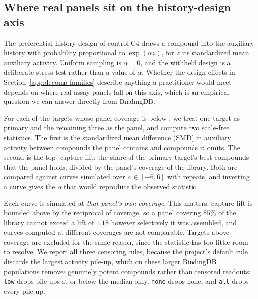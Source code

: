 \documentclass[10pt]{article}
\begin{document}
\subsection{Where real panels sit on the history-design axis}
\label{app:panel-alpha}

The preferential history design of control C4 draws a compound into the
auxiliary history with probability proportional to $\exp(\alpha z)$, for $z$
its standardized mean auxiliary activity. Uniform sampling is $\alpha=0$, and
the withheld design is a deliberate stress test rather than a value of
$\alpha$. Whether the design effects in Section~\ref{app:decomp-families}
describe anything a practitioner would meet depends on where real assay
panels fall on this axis, which is an empirical question we can answer
directly from BindingDB.

For each of the \panelReliableTargets{} targets whose panel coverage is below
\panelMaxCoverage{}, we treat one target as primary and the remaining three as
the panel, and compute two scale-free statistics. The first is the
standardized mean difference (SMD) in auxiliary activity between compounds the
panel contains and compounds it omits. The second is the top-\panelTopK{}
capture lift: the share of the primary target's \panelTopK{} best compounds
that the panel holds, divided by the panel's coverage of the library. Both are
compared against curves simulated over $\alpha\in[-6,6]$ with
\panelRepeats{} repeats, and inverting a curve gives the $\alpha$ that would
reproduce the observed statistic.

Each curve is simulated at \emph{that panel's own coverage}. This matters:
capture lift is bounded above by the reciprocal of coverage, so a panel
covering $85\%$ of the library cannot exceed a lift of $1.18$ however
selectively it was assembled, and curves computed at different coverages are
not comparable. Targets above \panelMaxCoverage{} coverage are excluded for
the same reason, since the statistic has too little room to resolve. We report
all three censoring rules, because the project's default rule discards the
largest activity pile-up, which on these larger BindingDB populations removes
genuinely potent compounds rather than censored readouts: \texttt{low} drops
pile-ups at or below the median only, \texttt{none} drops none, and
\texttt{all} drops every pile-up.

\begin{table}[htbp]
\centering\small

\caption{Real BindingDB panels on the history-design axis. Cov.\ is the
fraction of the primary target's library that the auxiliary panel covers. SMD
and capture lift are reported under all three censoring rules; $\alpha$ is
inverted under the \texttt{low} rule and is given from the SMD curve and the
lift curve respectively where each resolves. Em dashes mark statistics that
fall outside the simulated range. Targets with coverage above
\panelMaxCoverage{} are omitted.}
\label{tab:panel-alpha}
\end{table}
\end{document}
